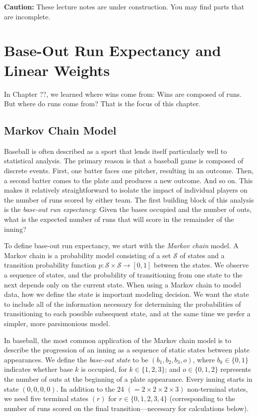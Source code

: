 \documentclass{article}
\begin{document}
\begin{framed}
  {\bf Caution:} These lecture notes are under construction. You may find parts that are incomplete.
\end{framed}

  \setcounter{section}{1}
  \section{\sc Base-Out Run Expectancy and Linear Weights}

    In Chapter ??, we learned where wins come from: Wins are composed of runs. But where do runs come from? That is the focus of this chapter.

    \subsection{\sc Markov Chain Model}

      Baseball is often described as a sport that lends itself particularly well to statistical analysis. The primary reason is that a baseball game is composed of discrete events. First, one batter faces one pitcher, resulting in an outcome. Then, a second batter comes to the plate and produces a new outcome. And so on. This makes it relatively straightforward to isolate the impact of individual players on the number of runs scored by either team. The first building block of this analysis is the {\it base-out run expectancy}: Given the bases occupied and the number of outs, what is the expected number of runs that will score in the remainder of the inning?

      To define base-out run expectancy, we start with the {\it Markov chain} model. A Markov chain is a probability model consisting of a set $\mathcal S$ of states and a transition probability function $p : \mathcal S \times \mathcal S \rightarrow [0, 1]$ between the states. We observe a sequence of states, and the probability of transitioning from one state to the next depends only on the current state. When using a Markov chain to model data, how we define the state is important modeling decision. We want the state to include all of the information necessary for determining the probabilities of transitioning to each possible subsequent state, and at the same time we prefer a simpler, more parsimonious model.

      In baseball, the most common application of the Markov chain model is to describe the progression of an inning as a sequence of static states between plate appearances. We define the {\it base-out state} to be $(b_1, b_2, b_3, o)$, where $b_k \in \{0, 1\}$ indicates whether base $k$ is occupied, for $k \in \{1, 2, 3\}$; and $o \in \{0, 1, 2\}$ represents the number of outs at the beginning of a plate appearance. Every inning starts in state $(0, 0, 0, 0)$. In addition to the 24 $(= 2 \times 2 \times 2 \times 3)$ non-terminal states, we need five terminal states $(r)$ for $r \in \{0, 1, 2, 3, 4\}$ (corresponding to the number of runs scored on the final transition---necessary for calculations below).
\end{document}
